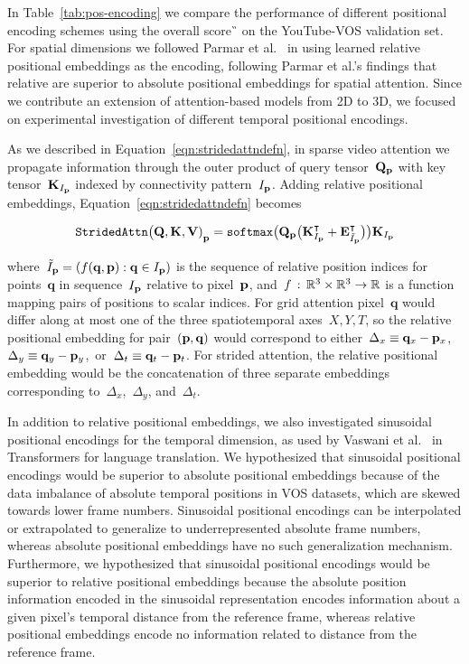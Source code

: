 In Table~\ref{tab:pos-encoding} we compare the performance of different
positional encoding schemes using the overall score~\G{} on the YouTube-VOS
validation set.
For spatial dimensions we followed Parmar et al.~\cite{parmar2019standalone} in
using learned relative positional embeddings as the encoding, following Parmar
et al.'s findings that relative are superior to absolute positional embeddings
for spatial attention.
Since we contribute an extension of attention-based models from 2D to 3D, we
focused on experimental investigation of different temporal positional
encodings.

As we described in Equation~\ref{eqn:stridedattndefn}, in sparse video
attention we propagate information through the outer product of query
tensor~$\mathbf{Q}_{\mathbf{p}}$ with key tensor~$\mathbf{K}_{I_{\mathbf{p}}}$ indexed by
connectivity pattern~$I_{\mathbf{p}}$.
Adding relative positional embeddings, Equation~\ref{eqn:stridedattndefn} becomes

\begin{equation}
        \mathtt{StridedAttn}{\big(\mathbf{Q}, \mathbf{K}, \mathbf{V})}_{\mathbf{p}}{} = \mathtt{softmax}\big(\mathbf{Q}_{\mathbf{p}}{} \big(\mathbf{K}^\intercal_{I_{\mathbf{p}}} + \mathbf{E}^\intercal_{\tilde{I}_{\mathbf{p}}}\big)\big)\mathbf{K}_{I_{\mathbf{p}}}
\end{equation}

where~$\tilde{I}_{\mathbf{p}}{} = (f(\mathbf{q}, \mathbf{p}) : \mathbf{q} \in I_{\mathbf{p}})$
is the sequence of relative position indices for points~$\mathbf{q}$ in
sequence~$I_{\mathbf{p}}$ relative to pixel~$\mathbf{p}$,
and~$f \,:\, \mathbb{R}^3\times \mathbb{R}^3 \rightarrow \mathbb{R}$ is a function mapping
pairs of positions to scalar indices.
For grid attention pixel~$\mathbf{q}$ would differ along at most one of the
three spatiotemporal axes~$X, Y, T$, so the relative positional embedding for
pair~$(\mathbf{p}, \mathbf{q})$ would correspond to
either~$\Delta_x \equiv \mathbf{q}_x - \mathbf{p}_x$,
$\Delta_y \equiv \mathbf{q}_y - \mathbf{p}_y$,~or~$\Delta_t \equiv \mathbf{q}_t - \mathbf{p}_t$.
For strided attention, the relative positional embedding would be the
concatenation of three separate embeddings corresponding
to~$\Delta_x$,~$\Delta_y$, and~$\Delta_t$.

In addition to relative positional embeddings, we also investigated sinusoidal
positional encodings for the temporal dimension, as used by Vaswani et
al.~\cite{vaswani2017attention} in Transformers for language translation.
We hypothesized that sinusoidal positional encodings would be superior to
absolute positional embeddings because of the data imbalance of absolute
temporal positions in VOS datasets, which are skewed towards lower frame
numbers.
Sinusoidal positional encodings can be interpolated or extrapolated to
generalize to underrepresented absolute frame numbers, whereas absolute
positional embeddings have no such generalization mechanism.
Furthermore, we hypothesized that sinusoidal positional encodings would be
superior to relative positional embeddings because the absolute position
information encoded in the sinusoidal representation encodes information about
a given pixel's temporal distance from the reference frame, whereas relative
positional embeddings encode no information related to distance from the
reference frame.

